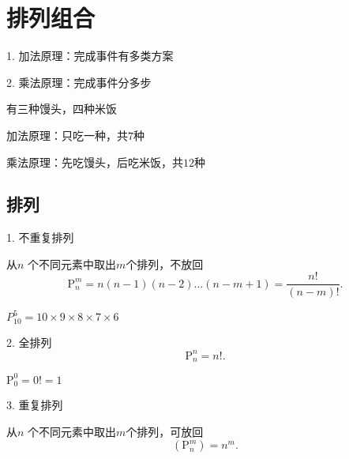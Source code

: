 \section{排列组合}%
\label{sub:排列组合}
1. 加法原理：完成事件有多类方案

2. 乘法原理：完成事件分多步
\begin{eg}
    有三种馒头，四种米饭

    加法原理：只吃一种，共$7$种

    乘法原理：先吃馒头，后吃米饭，共$12$种
\end{eg}
\subsection{排列}%
\label{sub:排列}
1. 不重复排列

从$n$ 个不同元素中取出$m$个排列，不放回
\[
    \mathrm{P}_{n}^{m}=n\left( n-1 \right) \left( n-2 \right) \ldots\left( n-m+1 \right)=\frac{n!}{\left( n-m \right) !} 
.\] 
\begin{eg}
    $P^5_{10}=10\times 9\times 8\times 7\times 6$
\end{eg}
2. 全排列
\[
    \mathrm{P}_{n}^{n}=n!
.\] 
\begin{eg}
    $\mathrm{P}_{0}^{0}=0! =1$
\end{eg}
3. 重复排列

从$n$ 个不同元素中取出$m$个排列，可放回
\[
    (\mathrm{P}_{n}^{m})=n^m
.\] 
